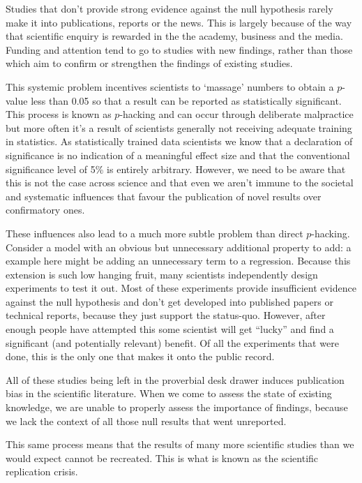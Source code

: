 \documentclass[
  12pt,
]{book}
\begin{document}
Studies that don't provide strong evidence against the null hypothesis rarely make it into publications, reports or the news. This is largely because of the way that scientific enquiry is rewarded in the the academy, business and the media. Funding and attention tend to go to studies with new findings, rather than those which aim to confirm or strengthen the findings of existing studies.

This systemic problem incentives scientists to `massage' numbers to obtain a \(p\)-value less than 0.05 so that a result can be reported as statistically significant. This process is known as \(p\)-hacking and can occur through deliberate malpractice but more often it's a result of scientists generally not receiving adequate training in statistics. As statistically trained data scientists we know that a declaration of significance is no indication of a meaningful effect size and that the conventional significance level of 5\% is entirely arbitrary. However, we need to be aware that this is not the case across science and that even we aren't immune to the societal and systematic influences that favour the publication of novel results over confirmatory ones.

These influences also lead to a much more subtle problem than direct \(p\)-hacking. Consider a model with an obvious but unnecessary additional property to add: a example here might be adding an unnecessary term to a regression. Because this extension is such low hanging fruit, many scientists independently design experiments to test it out. Most of these experiments provide insufficient evidence against the null hypothesis and don't get developed into published papers or technical reports, because they just support the status-quo. However, after enough people have attempted this some scientist will get ``lucky'' and find a significant (and potentially relevant) benefit. Of all the experiments that were done, this is the only one that makes it onto the public record.

All of these studies being left in the proverbial desk drawer induces publication bias in the scientific literature. When we come to assess the state of existing knowledge, we are unable to properly assess the importance of findings, because we lack the context of all those null results that went unreported.

This same process means that the results of many more scientific studies than we would expect cannot be recreated. This is what is known as the scientific replication crisis.
\end{document}
